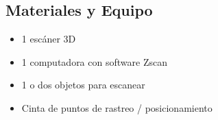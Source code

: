 \subsection{Materiales y Equipo}
\begin{multicols}{2}
\begin{itemize}
 \item 1 esc\'aner 3D
 \item 1 computadora con software Zscan
 \item 1 o dos objetos para escanear
 \item Cinta de puntos de rastreo / posicionamiento
\end{itemize}
\end{multicols}
